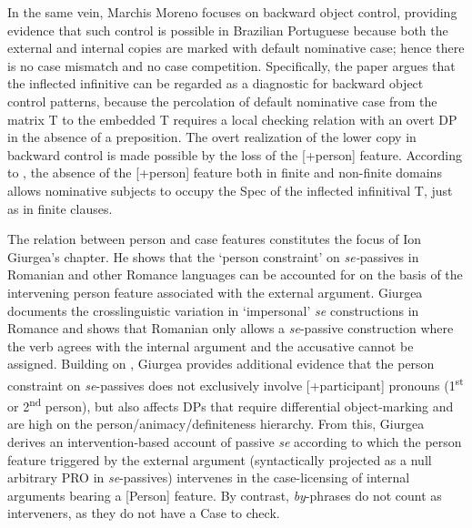 \documentclass[output=paper]{langsci/langscibook}
\begin{document}
In the same vein, Marchis Moreno focuses on backward object control, providing evidence that such control is possible in Brazilian Portuguese because both the external and internal copies are marked with default nominative case; hence there is no case mismatch and no case competition. Specifically, the paper argues that the inflected infinitive can be regarded as a diagnostic for backward object control patterns, because the percolation of default nominative case from the matrix T to the embedded T requires a local checking relation with an overt DP in the absence of a preposition. The overt realization of the lower copy in backward control is made possible by the loss of the [+person] feature. According to \citet{Cyrino2010}, the absence of the [+person] feature both in finite and non-finite domains allows nominative subjects to occupy the Spec of the inflected infinitival T, just as in finite clauses.

The relation between person and case features constitutes the focus of Ion Giurgea’s chapter. He shows that the ‘person constraint’ on \textit{se-}passives in Romanian and other Romance languages can be accounted for on the basis of the intervening person feature associated with the external argument. Giurgea documents the crosslinguistic variation in ‘impersonal’ \textit{se} constructions in Romance and shows that Romanian only allows a \textit{se}{}-passive construction where the verb agrees with the internal argument and the accusative cannot be assigned. Building on \citet{Cornilescu1998}, Giurgea provides additional evidence that the person constraint on \textit{se}{}-passives does not exclusively involve [+participant] pronouns (1\textsuperscript{st} or 2\textsuperscript{nd} person), but also affects DPs that require differential object-marking and are high on the person/animacy/definiteness hierarchy. From this, Giurgea derives an intervention-based account of passive \textit{se} according to which the person feature triggered by the external argument (syntactically projected as a null arbitrary PRO in \textit{se}{}-passives) intervenes in the case-licensing of internal arguments bearing a [Person] feature. By contrast, \textit{by}{}-phrases do not count as interveners, as they do not have a Case to check.
\end{document}
